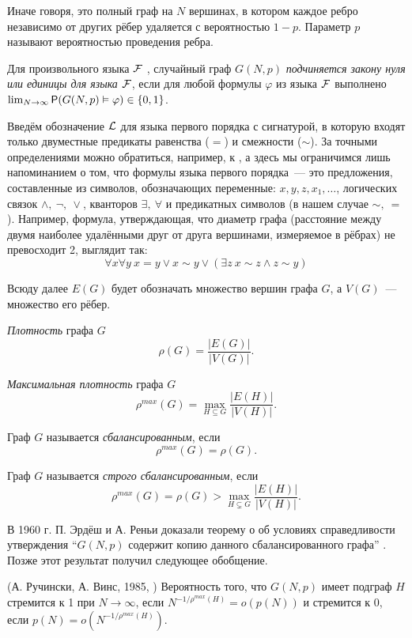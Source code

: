   Иначе говоря, это полный граф на $N$ вершинах, в котором каждое ребро независимо от других рёбер удаляется с вероятностью $1-p$.
  Параметр $p$ называют вероятностью проведения ребра.
    
    \Def Для произвольного языка $\F$ , случайный граф $G(N, p)$ \textit{подчиняется закону нуля или единицы для языка $\F$},
    если для любой формулы $\varphi$ из языка 
    $\F$  выполнено
    $\lim_{N \rightarrow \infty} \P(G(N, p) \vDash \varphi) \in \{0, 1\}$.
    
    Введём обозначение $\LL$ для языка первого порядка с сигнатурой, в которую входят только двуместные предикаты равенства ($=$) и смежности ($\sim$).
    За точными определениями можно обратиться, например, к
    \cite{shen}, а здесь мы ограничимся лишь напоминанием о том, что формулы языка первого порядка~--- это предложения, составленные из символов, обозначающих переменные: 
    $x,y,z,x_1,\ldots$, 
    логических связок 
    $\wedge, ~\neg, ~\vee$, 
    кванторов 
    $\exists, ~\forall$ и 
    предикатных символов (в нашем случае
    $\sim, ~ =$).
    Например, формула, утверждающая, что диаметр графа (расстояние между двумя наиболее удалёнными друг от друга вершинами, измеряемое в рёбрах) не превосходит 2, выглядит так:
    \[
    \forall x \forall y ~ x=y \vee x\sim y \vee \left( \exists z ~ x \sim z \wedge z \sim y \right)
    \]
    
    Всюду далее $E(G)$ будет обозначать множество вершин графа $G$, а $V(G)$~--- множество его рёбер.
    
    \Def \textit{Плотность} графа $G$ 
   \[ \rho(G) = \frac {|E(G)|}{|V(G)|} .\]
   
   \Def \textit{Максимальная плотность} графа $G$
     \[ \rho^{max}(G) = \max_{H \subseteq G} \frac {|E(H)|}{|V(H)|} .\]
    
    \Def Граф $G$ называется \textit{сбалансированным}, если 
    \[ \rho^{max}(G) = \rho(G) .\]
    
    \Def Граф $G$ называется \textit{строго сбалансированным}, если 
    \[\rho^{max}(G) = \rho(G) > \max_{H \subsetneq G} \frac {|E(H)|}{|V(H)|} .\]
     
В 1960 г. П. Эрдёш и А. Реньи
доказали теорему о об условиях справедливости утверждения ``$G(N, p)$ содержит копию данного сбалансированного графа'' \cite{erdHos1976evolution}. 
Позже этот результат получил следующее обобщение.
    
\begin{theorem} (А. Ручински, А. Винс, 1985, \cite{rucinski1985balanced}) 
\label{th:ruchinski}
Вероятность того, что $G(N, p)$ имеет подграф $H$ стремится к 1 при $N \rightarrow \infty$, если $N^{-1/\rho^{max}(H)} = o(p(N))$ и стремится к  0, если $p(N) = o\left(N^{-1/\rho^{max}(H)}\right)$.

\end{theorem}

